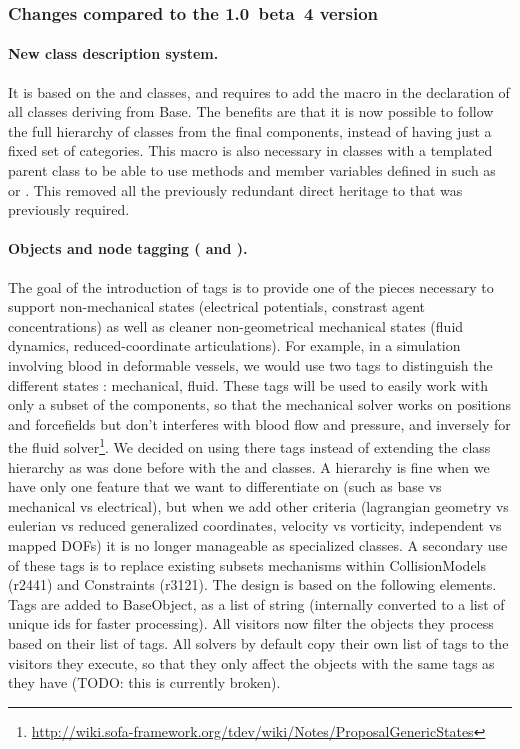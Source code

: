 \subsubsection{Changes compared to the 1.0~beta~4 version}\label{sec:design-core-objectmodel-changes}

\paragraph{New class description system.}
It is based on the  and  classes, and requires to add the  macro in the declaration of all classes deriving from Base.
The benefits are that it is now possible to follow the full hierarchy of classes from the final components, instead of having just a fixed set of categories.
This macro is also necessary in classes with a templated parent class to be able to use methods and member variables defined in  such as  or . This removed all the previously redundant direct heritage to  that was previously required.

\paragraph{Objects and node tagging ( and ).}
The goal of the introduction of tags is to provide one of the pieces necessary to support non-mechanical states (electrical potentials, constrast agent concentrations) as well as cleaner non-geometrical mechanical states (fluid dynamics, reduced-coordinate articulations).
For example, in a simulation involving blood in deformable vessels, we would use two tags to distinguish the different states : mechanical, fluid.
These tags will be used to easily work with only a subset of the components, so that the mechanical solver works on positions and forcefields but don't interferes with blood flow and pressure, and inversely for the fluid solver\footnote{\url{http://wiki.sofa-framework.org/tdev/wiki/Notes/ProposalGenericStates}}.
We decided on using there tags instead of extending the class hierarchy as was done before with the  and  classes.
A hierarchy is fine when we have only one feature that we want to differentiate on (such as base vs mechanical vs electrical), but when we add other criteria (lagrangian geometry vs eulerian vs reduced generalized coordinates, velocity vs vorticity, independent vs mapped DOFs) it is no longer manageable as specialized classes.
A secondary use of these tags is to replace existing subsets mechanisms within CollisionModels (r2441) and Constraints (r3121).
The design is based on the following elements.
Tags are added to BaseObject, as a list of string (internally converted to a list of unique ids for faster processing).
All visitors now filter the objects they process based on their list of tags.
All solvers by default copy their own list of tags to the visitors they execute, so that they only affect the objects with the same tags as they have (TODO: this is currently broken). 


